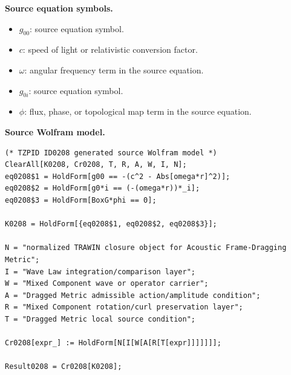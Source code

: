 \begin{minipage}[t]{0.49\linewidth}
\begingroup
\small
\raggedright
\textbf{Source equation symbols.}\par
\begin{itemize}[leftmargin=1.35em,itemsep=1pt,topsep=1pt,parsep=0pt]
    \item $g_{00}$: source equation symbol.
    \item $c$: speed of light or relativistic conversion factor.
    \item $\omega$: angular frequency term in the source equation.
    \item $g_{0i}$: source equation symbol.
    \item $\phi$: flux, phase, or topological map term in the source equation.
\end{itemize}
\endgroup
\end{minipage}\hfill
\begin{minipage}[t]{0.47\linewidth}
\begingroup
\scriptsize
\raggedright
\textbf{Source Wolfram model.}\par
\begin{Verbatim}[fontsize=\tiny,breaklines=true,breakanywhere=true]
(* TZPID ID0208 generated source Wolfram model *)
ClearAll[K0208, Cr0208, T, R, A, W, I, N];
eq0208$1 = HoldForm[g00 == -(c^2 - Abs[omega*r]^2)];
eq0208$2 = HoldForm[g0*i == (-(omega*r))*_i];
eq0208$3 = HoldForm[BoxG*phi == 0];

K0208 = HoldForm[{eq0208$1, eq0208$2, eq0208$3}];

N = "normalized TRAWIN closure object for Acoustic Frame-Dragging Metric";
I = "Wave Law integration/comparison layer";
W = "Mixed Component wave or operator carrier";
A = "Dragged Metric admissible action/amplitude condition";
R = "Mixed Component rotation/curl preservation layer";
T = "Dragged Metric local source condition";

Cr0208[expr_] := HoldForm[N[I[W[A[R[T[expr]]]]]]];

Result0208 = Cr0208[K0208];
\end{Verbatim}
\endgroup
\end{minipage}

